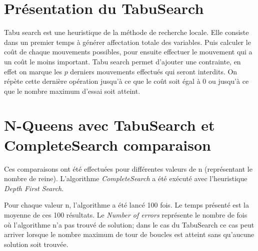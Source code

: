 \documentclass[a4paper,10pt]{article}
\begin{document}
\section{Présentation du TabuSearch}
Tabu search est une heuristique de la méthode de recherche locale. Elle consiste dans un premier temps à générer affectation totale des variables. Puis
calculer le coût de chaque mouvements possibles, pour ensuite effectuer le mouvement qui a un coût le moins important. Tabu search permet d'ajouter une
contrainte, en effet on marque les $p$ derniers mouvements effectués qui seront interdits. On répète cette dernière opération jusqu'à ce que le coût soit égal à
0 ou jusqu'à ce que le nombre maximum d'essai soit atteint.

\section{N-Queens avec TabuSearch et CompleteSearch comparaison}

Ces comparaisons ont été effectuées pour différentes valeurs de n (représentant le nombre de reine). L'algorithme \emph{CompleteSearch} a été exécuté avec l'heuristique \emph{Depth First Search}.

Pour chaque valeur n, l'algorithme a été lancé 100 fois. Le temps présenté est la moyenne de ces 100 résultats. Le \emph{Number of errors} représente le nombre de fois où l'algorithme n'a pas trouvé de solution; dans le cas du TabuSearch ce cas peut arriver lorsque le nombre maximum de tour de boucles est atteint sans qu'aucune solution soit trouvée. \newline
\end{document}
